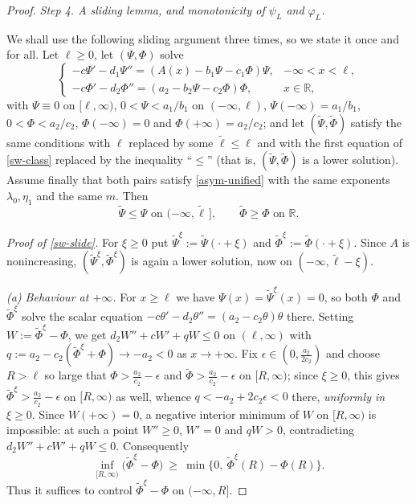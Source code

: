 \documentclass[reqno]{amsart}
\newcommand{\rev}[1]{#1}
\theoremstyle{plain}
\theoremstyle{definition}
\theoremstyle{remark}
\begin{document}
\begin{proof}
		\rev{\textit{Step 4. A sliding lemma, and monotonicity of $\psi_L$ and $\varphi_L$.}}

		\rev{We shall use the following sliding argument three times, so we state it
		once and for all. Let $\ell\ge0$, let $(\Psi,\Phi)$ solve
		\begin{equation}\label{sw-class}
			\begin{cases}
				-c \Psi' - d_1 \Psi'' = (A(x) - b_1\Psi - c_1\Phi)\Psi, & -\infty<x<\ell,\\
				-c \Phi' - d_2 \Phi'' = (a_2 - b_2\Psi - c_2\Phi)\Phi, & x\in\mathbb{R},
			\end{cases}
		\end{equation}
		with $\Psi\equiv0$ on $[\ell,\infty)$, $0<\Psi<a_1/b_1$ on $(-\infty,\ell)$,
		$\Psi(-\infty)=a_1/b_1$, $0<\Phi<a_2/c_2$, $\Phi(-\infty)=0$ and
		$\Phi(+\infty)=a_2/c_2$; and let $(\tilde\Psi,\tilde\Phi)$ satisfy the same
		conditions with $\ell$ replaced by some $\tilde\ell\le\ell$ and with the
		first equation of \eqref{sw-class} replaced by the inequality ``$\le$''
		(that is, $(\tilde\Psi,\tilde\Phi)$ is a lower solution). Assume finally
		that both pairs satisfy \eqref{asym-unified} with the same exponents
		$\lambda_0,\eta_1$ and the same $m$. Then
		\begin{equation}\label{sw-slide}
			\tilde\Psi\le\Psi \text{ on } (-\infty,\tilde\ell\,],
			\qquad
			\tilde\Phi\ge\Phi \text{ on } \mathbb{R}.
		\end{equation}}

		\rev{\emph{Proof of \eqref{sw-slide}.} For $\xi\ge0$ put
		$\tilde\Psi^\xi:=\tilde\Psi(\cdot+\xi)$ and $\tilde\Phi^\xi:=\tilde\Phi(\cdot+\xi)$.
		Since $A$ is nonincreasing, $(\tilde\Psi^\xi,\tilde\Phi^\xi)$ is again a lower
		solution, now on $(-\infty,\tilde\ell-\xi)$.}

		\rev{\emph{(a) Behaviour at $+\infty$.} For $x\ge\ell$ we have
		$\Psi(x)=\tilde\Psi^\xi(x)=0$, so both $\Phi$ and $\tilde\Phi^\xi$ solve the
		scalar equation $-c\theta'-d_2\theta''=(a_2-c_2\theta)\theta$ there. Setting
		$W:=\tilde\Phi^\xi-\Phi$, we get $d_2W''+cW'+qW\le0$ on $(\ell,\infty)$ with
		$q:=a_2-c_2(\tilde\Phi^\xi+\Phi)\to-a_2<0$ as $x\to+\infty$. Fix
		$\epsilon\in(0,\frac{a_2}{2c_2})$ and choose $R>\ell$ so large that
		$\Phi>\frac{a_2}{c_2}-\epsilon$ and $\tilde\Phi>\frac{a_2}{c_2}-\epsilon$ on
		$[R,\infty)$; since $\xi\ge0$, this gives
		$\tilde\Phi^\xi>\frac{a_2}{c_2}-\epsilon$ on $[R,\infty)$ as well, whence
		$q<-a_2+2c_2\epsilon<0$ there, \emph{uniformly in} $\xi\ge0$. Since $W(+\infty)=0$, a negative interior minimum of
		$W$ on $[R,\infty)$ is impossible: at such a point $W''\ge0$, $W'=0$ and
		$qW>0$, contradicting $d_2W''+cW'+qW\le0$. Consequently
		\begin{equation}\label{sw-tail}
			\inf_{[R,\infty)}\bigl(\tilde\Phi^\xi-\Phi\bigr)\ \ge\ \min\bigl\{0,\ \tilde\Phi^\xi(R)-\Phi(R)\bigr\}.
		\end{equation}
		Thus it suffices to control $\tilde\Phi^\xi-\Phi$ on $(-\infty,R]$.}


\end{proof}
\end{document}
